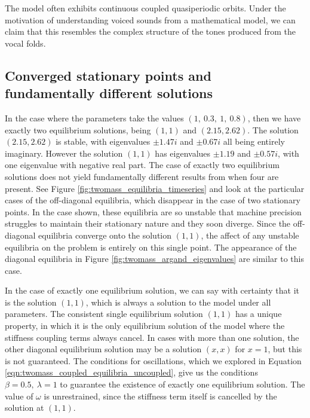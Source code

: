 The model often exhibits continuous coupled quasiperiodic orbits.
Under the motivation of understanding voiced sounds from a mathematical model,
we can claim that this resembles the complex structure of the tones produced from the vocal folds.

\subsection{Converged stationary points and fundamentally different solutions}

In the case where the parameters take the values \((1,~0.3,~1,~0.8)\),
then we have exactly two equilibrium solutions,
being \((1,1)\) and \((2.15,2.62)\).
The solution \((2.15,2.62)\) is stable, with eigenvalues $\pm 1.47i$ and $\pm 0.67i$ all being entirely imaginary.
However the solution \((1,1)\) has eigenvalues $\pm 1.19$ and $\pm 0.57i$, with one eigenvalue with negative real part. %
The case of exactly two equilibrium solutions does not yield fundamentally different results from when four are present.
See Figure \ref{fig:twomass_equilibria_timeseries} and look at the particular cases of the off-diagonal equilibria,
which disappear in the case of two stationary points.
In the case shown, these equilibria are so unstable that machine precision struggles to maintain their stationary nature and they soon diverge.
Since the off-diagonal equilibria converge onto the solution \((1,1)\),
the affect of any unstable equilibria on the problem is entirely on this single point.
The appearance of the diagonal equilibria in Figure \ref{fig:twomass_argand_eigenvalues} are similar to this case.

In the case of exactly one equilibrium solution,
we can say with certainty that it is the solution \((1,1)\),
which is always a solution to the model under all parameters.
The consistent single equilibrium solution \((1,1)\) has a unique property,
in which it is the only equilibrium solution of the model where the stiffness coupling terms always cancel.
In cases with more than one solution, the other diagonal equilibrium solution may be a solution \((x,x)\) for $x=1$,
but this is not guaranteed.
The conditions for oscillations,
which we explored in Equation \ref{eqn:twomass_coupled_equilibria_uncoupled},
give us the conditions \(\beta=0.5,~\lambda=1\) to guarantee the existence of exactly one equilibrium solution.
The value of $\omega$ is unrestrained, since the stiffness term itself is cancelled by the solution at \((1,1)\).

